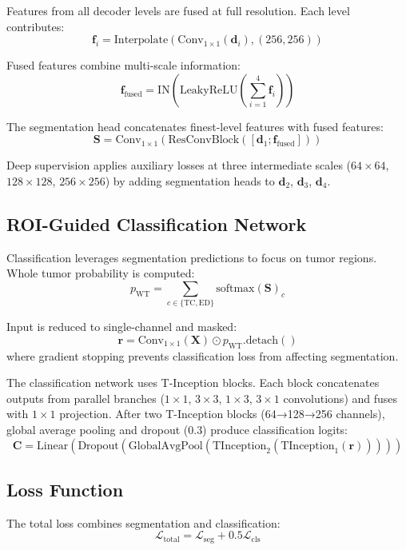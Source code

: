 Features from all decoder levels are fused at full resolution. Each level contributes:
\[
\mathbf{f}_i = \text{Interpolate}(\text{Conv}_{1\times1}(\mathbf{d}_i), (256, 256))
\]

Fused features combine multi-scale information:
\[
\mathbf{f}_{\text{fused}} = \text{IN}(\text{LeakyReLU}(\sum_{i=1}^{4} \mathbf{f}_i))
\]

The segmentation head concatenates finest-level features with fused features:
\[
\mathbf{S} = \text{Conv}_{1\times1}(\text{ResConvBlock}([\mathbf{d}_1; \mathbf{f}_{\text{fused}}]))
\]

Deep supervision applies auxiliary losses at three intermediate scales ($64\times64$, $128\times128$, $256\times256$) by adding segmentation heads to $\mathbf{d}_2$, $\mathbf{d}_3$, $\mathbf{d}_4$.

\subsection{ROI-Guided Classification Network}

Classification leverages segmentation predictions to focus on tumor regions. Whole tumor probability is computed:
\[
p_{\text{WT}} = \sum_{c \in \{\text{TC}, \text{ED}\}} \text{softmax}(\mathbf{S})_c
\]

Input is reduced to single-channel and masked:
\[
\mathbf{r} = \text{Conv}_{1\times1}(\mathbf{X}) \odot p_{\text{WT}}.\text{detach}()
\]
where gradient stopping prevents classification loss from affecting segmentation.

The classification network uses T-Inception blocks. Each block concatenates outputs from parallel branches ($1\times1$, $3\times3$, $1\times3$, $3\times1$ convolutions) and fuses with $1\times1$ projection. After two T-Inception blocks (64→128→256 channels), global average pooling and dropout (0.3) produce classification logits:
\[
\mathbf{C} = \text{Linear}(\text{Dropout}(\text{GlobalAvgPool}(\text{TInception}_2(\text{TInception}_1(\mathbf{r})))))
\]

\subsection{Loss Function}

The total loss combines segmentation and classification:
\begin{equation}
\mathcal{L}_{\text{total}} = \mathcal{L}_{\text{seg}} + 0.5 \mathcal{L}_{\text{cls}}
\label{eq:total_loss}
\end{equation}

